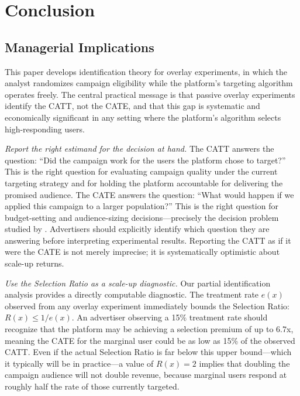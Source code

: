 \documentclass[11pt]{article}
\begin{document}
\section{Conclusion}
\label{sec:conclusion}

\subsection{Managerial Implications}
\label{subsec:managerial}

This paper develops identification theory for overlay experiments, in which the
analyst randomizes campaign eligibility while the platform's targeting algorithm
operates freely.  The central practical message is that passive overlay
experiments identify the CATT, not the CATE, and that this gap is systematic
and economically significant in any setting where the platform's algorithm
selects high-responding users.

\emph{Report the right estimand for the decision at hand.}  The CATT answers
the question: ``Did the campaign work for the users the platform chose to
target?''  This is the right question for evaluating campaign quality under the
current targeting strategy and for holding the platform accountable for
delivering the promised audience.  The CATE answers the question: ``What would
happen if we applied this campaign to a larger population?''  This is the right
question for budget-setting and audience-sizing decisions---precisely the
decision problem studied by \citet{waisman2025multicell}.  Advertisers should
explicitly identify which question they are answering before interpreting
experimental results.  Reporting the CATT as if it were the CATE is not merely
imprecise; it is systematically optimistic about scale-up returns.

\emph{Use the Selection Ratio as a scale-up diagnostic.}  Our partial
identification analysis provides a directly computable diagnostic.  The
treatment rate $e(x)$ observed from any overlay experiment immediately bounds the
Selection Ratio: $R(x) \leq 1/e(x)$.  An advertiser observing a 15\% treatment
rate should recognize that the platform may be achieving a selection premium of
up to 6.7x, meaning the CATE for the marginal user could be as low as 15\% of
the observed CATT.  Even if the actual Selection Ratio is far below this upper
bound---which it typically will be in practice---a value of $R(x) = 2$ implies
that doubling the campaign audience will not double revenue, because marginal
users respond at roughly half the rate of those currently targeted.
\end{document}
